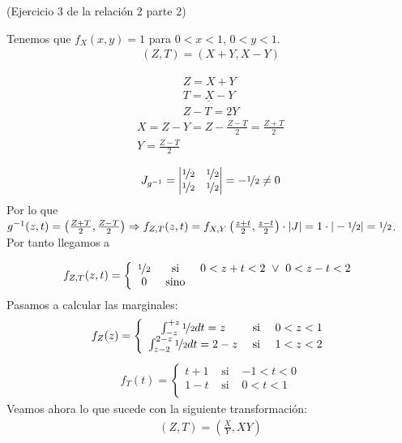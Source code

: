 \begin{ejercicio}(Ejercicio 3 de la relación 2 parte 2)

    Tenemos que $f_X(x,y)=1$ para $0<x<1$, $0<y<1$.
    \begin{gather*}
        (Z,T)=(X+Y, X-Y)
    \end{gather*}

    \begin{align*}
        Z=X+Y\\
        \underline{T=X-Y}\\
        Z-T = 2Y
    \end{align*}
    \begin{gather*}
        X=Z-Y = Z - \frac{Z-T}{2} = \frac{Z+T}{2}\\
        Y=\frac{Z-T}{2}\\
    \end{gather*}
    \begin{gather*}
        J_{g^{-1}} = 
        \begin{vmatrix}
            \nicefrac{1}{2} & \nicefrac{1}{2}\\
            \nicefrac{1}{2} & \nicefrac{1}{2}
        \end{vmatrix} = -\nicefrac{1}{2} \neq 0
    \end{gather*}
    Por lo que $g^{-1}(z,t)=\left(\frac{Z+T}{2}, \frac{Z-T}{2}\right) \Rightarrow f_{Z,T}(z,t) = f_{X,Y}\left(\frac{z+t}{2}, \frac{z-t}{2} \right)\cdot |J| = 1 \cdot |-\nicefrac{1}{2}| = \nicefrac{1}{2}$. Por tanto llegamos a 

    \begin{gather*}
        f_{Z,T}(z,t)=\left\{
        \begin{array}{ccc}
            \nicefrac{1}{2}& \text{ si } & 0<z+t<2 \ \vee \  0<z-t<2\\
            0 & \text{ sino } & 
        \end{array}
        \right.
    \end{gather*}
    Pasamos a calcular las marginales:
    \begin{gather*}
        f_Z(z) =\left\{
        \begin{array}{ccc}
            \int_{-z}^{+z} \nicefrac{1}{2}dt=z & \text{ si } & 0<z<1\\
            \int_{z-2}^{2-z}\nicefrac{1}{2}dt = 2-z & \text{ si } & 1<z<2\\
        \end{array}
        \right.
    \end{gather*}
    \begin{gather*}
        f_T(t) =\left\{
        \begin{array}{ccc}
            t+1 & \text{ si } & -1<t<0\\
            1-t & \text{ si } & 0<t<1\\
        \end{array}
        \right.
    \end{gather*}
    Veamos ahora lo que sucede con la siguiente transformación:
    \begin{gather*}
        (Z,T) = \left(\frac{X}{Y}, XY\right)
    \end{gather*}
\end{ejercicio}